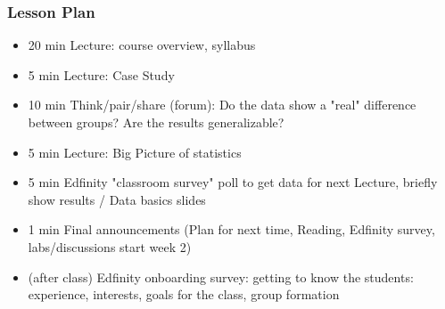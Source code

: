 \begin{frame}
    \frametitle{Lesson Plan}
    \begin{itemize}
        \item 20 min Lecture: course overview, syllabus
        \item 5 min Lecture: Case Study
        \item 10 min Think/pair/share (forum): Do the data show a "real" difference between groups? Are the results generalizable?
        \item 5 min Lecture: Big Picture of statistics
        \item 5 min Edfinity "classroom survey" poll to get data for next Lecture, briefly show results / Data basics slides
        \item 1 min Final announcements (Plan for next time, Reading, Edfinity survey, labs/discussions start week 2)
        \item (after class) Edfinity onboarding survey: getting to know the students: experience, interests, goals for the class, group formation
    \end{itemize}
\end{frame}
    


